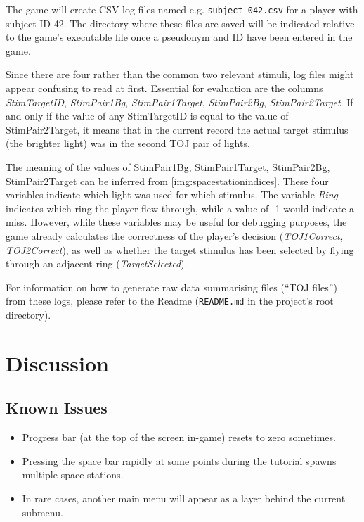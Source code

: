 \documentclass[11pt,a4paper]{article}
\begin{document}
        The game will create CSV log files named e.g. \texttt{subject-042.csv} for a player with subject ID 42. The directory where these files are saved will be indicated relative to the game's executable file once a pseudonym and ID have been entered in the game.
            
        Since there are four rather than the common two relevant stimuli, log files might appear confusing to read at first. Essential for evaluation are the columns \emph{StimTargetID}, \emph{StimPair1Bg}, \emph{StimPair1Target}, \emph{StimPair2Bg}, \emph{StimPair2Target}. If and only if the value of any StimTargetID is equal to the value of StimPair2Target, it means that in the current record the actual target stimulus (the brighter light) was in the second TOJ pair of lights.
            
        The meaning of the values of StimPair1Bg, StimPair1Target, StimPair2Bg, StimPair2Target can be inferred from \autoref{img:spacestationindices}. These four variables indicate which light was used for which stimulus. The variable \emph{Ring} indicates which ring the player flew through, while a value of -1 would indicate a miss. However, while these variables may be useful for debugging purposes, the game already calculates the correctness of the player's decision (\emph{TOJ1Correct}, \emph{TOJ2Correct}), as well as whether the target stimulus has been selected by flying through an adjacent ring (\emph{TargetSelected}).
            
        For information on how to generate raw data summarising files (\enquote{TOJ files}) from these logs, please refer to the Readme (\texttt{README.md} in the project's root directory).
        
        
    \section{Discussion}    
            
        \subsection{Known Issues}

        	\begin{itemize}
            	\item Progress bar (at the top of the screen in-game) resets to zero sometimes.
                \item Pressing the space bar rapidly at some points during the tutorial spawns multiple space stations.
                \item In rare cases, another main menu will appear as a layer behind the current submenu.
            \end{itemize}
            
\end{document}
